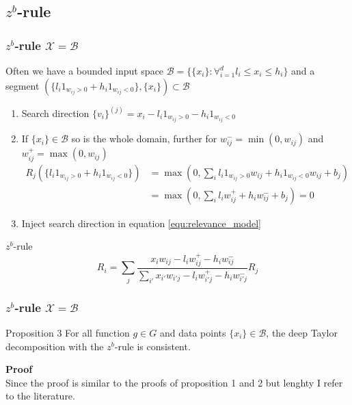 \documentclass{beamer}
\begin{document}
\subsection[$z^b$-rule]{$z^b$-rule}


\begin{frame}
\frametitle{$z^b$-rule $\mathcal{X}=\mathcal{B}$}
\vspace{0.4cm}
Often we have a bounded input space $\mathcal{B} = \{\{x_i\} : \forall_{i=1}^d l_i\leq x_i \leq h_i\} $ and a segment $(\{l_i 1_{w_{ij}>0} + h_i 1_{w_{ij}<0}\},\{x_i\})\subset \mathcal{B}$\\
\begin{enumerate}
	\item Search direction $\{v_i\}^{(j)} = x_i - l_i 1_{w_{ij}>0} - h_i 1_{w_{ij}<0}$
	\item If $\{x_i\} \in \mathcal{B}$ so is the whole domain, further for $w_{ij}^-=\min(0,w_{ij})$ and $w_{ij}^+=\max(0,w_{ij})$
	\vspace{-0.25cm}
	\begin{align*}
		R_j(\{l_i 1_{w_{ij}>0} + h_i 1_{w_{ij}<0}\}) &= \max(0, \sum_i l_i 1_{w_{ij}>0} w_{ij} + h_i 1_{w_{ij}<0} w_{ij} + b_j)\\
		&=\max(0, \sum_i l_i w_{ij}^+ + h_i w_{ij}^- + b_j)= 0
	\end{align*}
	\vspace{-0.25cm}
	\item Inject search direction in equation \eqref{equ:relevance_model}
\end{enumerate}
\vspace{-0.25cm}

\begin{block}{$z^b$-rule}
\begin{equation*}
R_i =  \sum_j \frac{x_i w_{ij} - l_i w_{ij}^+ - h_i w_{ij}^-}{\sum_{i'} x_{i'} w_{i'j}  - l_i w_{i'j}^+ - h_i w_{i'j}^-} R_j
\end{equation*}
\end{block}
\end{frame}



\begin{frame}
\frametitle{$z^b$-rule $\mathcal{X}=\mathcal{B}$}
\vspace{-0.4cm}
\begin{block}{Proposition 3}
For all function $g \in G$ and data points $\{x_i\} \in \mathcal{B}$, the deep Taylor decomposition with the $z^b$-rule is consistent.
\end{block}
\vspace{0.5cm}
\textbf{Proof}\\
Since the proof is similar to the proofs of proposition 1 and 2 but lenghty I refer to the literature.

\end{frame}
\end{document}
